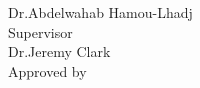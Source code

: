 \begin{titlepage}
{    \hspace*{77pt}Dr.\@ Abdelwahab Hamou-Lhadj\\[2.5ex]
    \hspace*{77pt}\underline{\hspace{234pt}} Supervisor \\
    \hspace*{77pt}Dr.\@ Jeremy Clark\\[2.5ex]
    Approved by \hspace{9pt}\underline{\hspace{232pt}}\\

}
  \end{titlepage}

